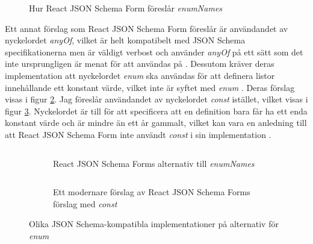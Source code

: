 \begin{figure}
	\inputminted[tabsize=2, frame=single, fontsize=\small, framesep=2mm, breaklines]{json}{code/enum-example/extra-array.json}
	\vspace{-1.7em}
	\caption{Hur React JSON Schema Form föreslår \textit{enumNames} \cite{MozillaServices}}
	\label{fig:enum-example:extra-array}
\end{figure}

Ett annat förslag som React JSON Schema Form föreslår är användandet av nyckelordet \textit{anyOf}, vilket är helt kompatibelt med JSON Schema specifikationerna men är väldigt verbost och använder \textit{anyOf} på ett sätt som det inte ursprungligen är menat för att användas på \cite{MozillaServices, Andrews2018}. Dessutom kräver deras implementation att nyckelordet \textit{enum} ska användas för att definera listor innehållande ett konstant värde, vilket inte är syftet med \textit{enum} \cite{Andrews2018}. Deras förslag visas i figur \ref{fig:enum-example:any-of}. Jag föreslår användandet av nyckelordet \textit{const} istället, vilket visas i figur \ref{fig:enum-example:any-of-const}. Nyckelordet är till för att specificera att en definition bara får ha ett enda konstant värde och är mindre än ett år gammalt, vilket kan vara en anledning till att React JSON Schema Form inte användt \textit{const} i sin implementation \cite{Andrews2018}.

\begin{figure}
	\begin{subfigure}[t]{0.47\textwidth}
		\inputminted[tabsize=2, frame=single, fontsize=\small, framesep=2mm, breaklines]{json}{code/enum-example/any-of.json}
		\vspace{-1.2em}
		\caption{React JSON Schema Forms alternativ till \textit{enumNames} \cite{MozillaServices}}
		\label{fig:enum-example:any-of}
	\end{subfigure}\hfill
	\begin{subfigure}[t]{0.47\textwidth}
		\inputminted[tabsize=2, frame=single, fontsize=\small, framesep=2mm, breaklines]{json}{code/enum-example/any-of-const.json}
		\vspace{-1.2em}
		\caption{Ett modernare förslag av React JSON Schema Forms förslag med \textit{const}}
		\label{fig:enum-example:any-of-const}
	\end{subfigure}
	\caption{Olika JSON Schema-kompatibla implementationer på alternativ för \textit{enum}}
	\label{fig:enum-example:any-of-examples}
\end{figure}

